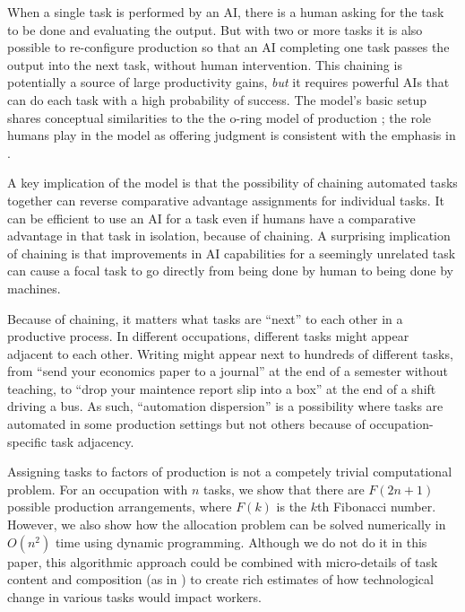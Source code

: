 \documentclass{article}
\theoremstyle{plain}
\theoremstyle{plain}
\begin{document}
When a single task is performed by an AI, there is a human asking for the task to be done and evaluating the output.
But with two or more tasks it is also possible to re-configure production so that an AI completing one task passes the output into the next task, without human intervention.
This chaining is potentially a source of large productivity gains, \emph{but} it requires powerful AIs that can do each task with a high probability of success. 
The model's basic setup shares conceptual similarities to the the o-ring model of production \citep{kremer1993}; the role humans play in the model as offering judgment is consistent with the emphasis in \cite{agrawal2019exploring}.

A key implication of the model is that the possibility of chaining automated tasks together can reverse comparative advantage assignments for individual tasks. 
It can be efficient to use an AI for a task even if humans have a comparative advantage in that task in isolation, because of chaining.
A surprising implication of chaining is that improvements in AI capabilities for a seemingly unrelated task can cause a focal task to go directly from being done by human to being done by machines.

Because of chaining, it matters what tasks are ``next'' to each other in a productive process.
In different occupations, different tasks might appear adjacent to each other. 
Writing might appear next to hundreds of different tasks, from ``send your economics paper to a journal'' at the end of a semester without teaching, to ``drop your maintence report slip into a box'' at the end of a shift driving a bus.
As such, ``automation dispersion'' is a possibility where tasks are automated in some production settings but not others because of occupation-specific task adjacency.

Assigning tasks to factors of production is not a competely trivial computational problem.
For an occupation with $n$ tasks, we show that there are $F(2n + 1)$ possible production arrangements, where $F(k)$ is the $k$th Fibonacci number.
However, we also show how the allocation problem can be solved numerically in $O(n^2)$ time using dynamic programming.
Although we do not do it in this paper, this algorithmic approach could be combined with micro-details of task content and composition (as in \cite{frey2017future, felten2021occupational, eloundou2023gpts}) to create rich estimates of how technological change in various tasks would impact workers. 
\end{document}
